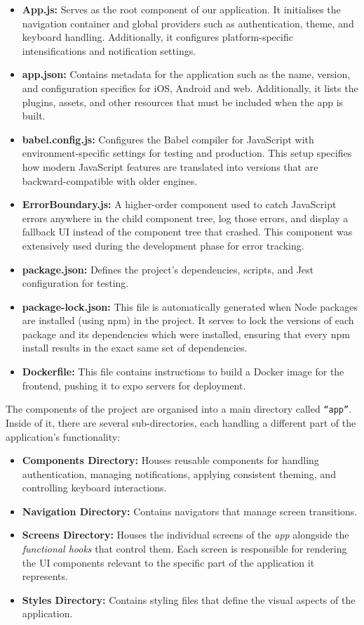 \begin{itemize}
    \item \textbf{App.js:} Serves as the root component of our application. It initialises the navigation container and global providers such as authentication, theme, and keyboard handling. Additionally, it configures platform-specific intensifications and notification settings.
    \item \textbf{app.json:} Contains metadata for the application such as the name, version, and configuration specifics for iOS, Android and web. Additionally, it lists the plugins, assets, and other resources that must be included when the app is built.
    \item \textbf{babel.config.js:} Configures the Babel compiler for JavaScript with environment-specific settings for testing and production. This setup specifies how modern JavaScript features are translated into versions that are backward-compatible with older engines.
    \item \textbf{ErrorBoundary.js:} A higher-order component used to catch JavaScript errors anywhere in the child component tree, log those errors, and display a fallback UI instead of the component tree that crashed. This component was extensively used during the development phase for error tracking.
    \item \textbf{package.json:} Defines the project’s dependencies, scripts, and Jest configuration for testing.
    \item \textbf{package-lock.json:} This file is automatically generated when Node packages are installed (using npm) in the project. It serves to lock the versions of each package and its dependencies which were installed, ensuring that every npm install results in the exact same set of dependencies.
    \item \textbf{Dockerfile:} This file contains instructions to build a Docker image for the frontend, pushing it to expo servers for deployment.
\end{itemize}

The components of the project are organised into a main directory called \texttt{``app''}. Inside of it, there are several sub-directories, each handling a different part of the application's functionality:

\begin{itemize}
    \item \textbf{Components Directory:} Houses reusable components for handling authentication, managing notifications, applying consistent theming, and controlling keyboard interactions.
    \item \textbf{Navigation Directory:} Contains navigators that manage screen transitions.
    \item \textbf{Screens Directory:} Houses the individual screens of the \textit{app} alongside the \textit{functional hooks} that control them. Each screen is responsible for rendering the UI components relevant to the specific part of the application it represents.
    \item \textbf{Styles Directory:} Contains styling files that define the visual aspects of the application.
\end{itemize}

